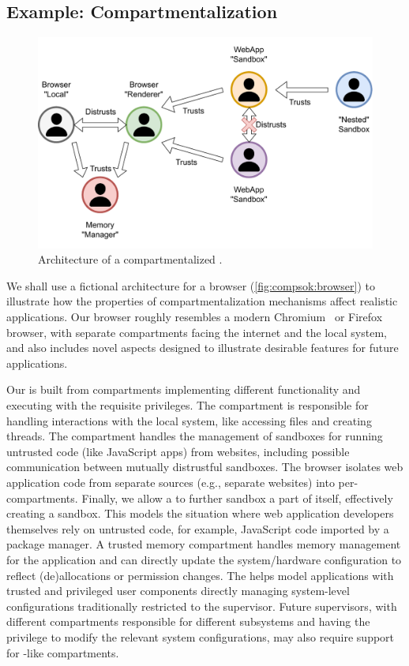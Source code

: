 \subsection{Example: \browser Compartmentalization}
\begin{figure}
  \includegraphics[width=\linewidth]{media/compsok/hierarchy_trust.pdf}
  \caption[Architecture of a compartmentalized \browser]
          {Architecture of a compartmentalized \browser.}
  \label{fig:compsok:browser}
\end{figure}

We shall use a fictional architecture for a browser 
(\autoref{fig:compsok:browser})
to illustrate how the properties of compartmentalization mechanisms 
affect realistic applications.
Our browser roughly resembles a modern Chromium~\cite{barth2008security} 
or Firefox~\cite{wxexclusionfirefox, fffission} browser, 
with separate compartments facing the internet and the local system,
and also includes novel aspects designed to illustrate desirable features
for future applications.

Our \browser is built from compartments implementing different
functionality and executing with the requisite privileges.
The \local compartment is responsible for handling interactions 
with the local system, like accessing files and creating threads.
The \renderer compartment handles the management of sandboxes for running
untrusted code (like JavaScript apps) from websites, including possible
communication between mutually distrustful sandboxes.
The browser isolates web application code from 
separate sources (e.g., separate websites) 
into per-\sandbox compartments.
Finally, we allow a \sandbox to further sandbox a part of itself, effectively
creating a \nested sandbox.
This models the situation where web application developers themselves 
rely on untrusted code, for example, JavaScript code imported by a 
package manager.
A trusted memory \manager compartment handles memory management for the
application and can directly update the system/hardware configuration to 
reflect (de)allocations or permission changes.
The \manager helps model applications with trusted and privileged user 
components directly managing system-level configurations traditionally 
restricted to the supervisor.
Future supervisors, with different compartments responsible for different 
subsystems and having the privilege to modify the relevant system configurations,
may also require support for \manager-like compartments.


